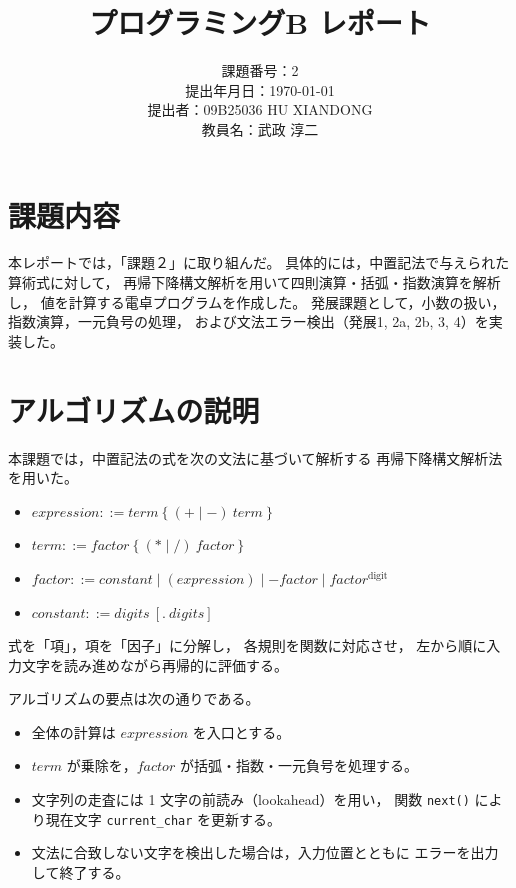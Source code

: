 \documentclass[a4paper,12pt,titlepage]{jsarticle}
\title{プログラミングB レポート}
\author{課題番号：2\\提出年月日：\today\\提出者：09B25036 HU XIANDONG\\教員名：武政 淳二}
\date{}
\begin{document}
\maketitle

\section{課題内容}

本レポートでは，「課題２」に取り組んだ。
具体的には，中置記法で与えられた算術式に対して，
再帰下降構文解析を用いて四則演算・括弧・指数演算を解析し，
値を計算する電卓プログラムを作成した。
発展課題として，小数の扱い，指数演算，一元負号の処理，
および文法エラー検出（発展1, 2a, 2b, 3, 4）を実装した。

\section{アルゴリズムの説明}

本課題では，中置記法の式を次の文法に基づいて解析する
再帰下降構文解析法を用いた。

\begin{itemize}
    \item $expression ::= term\ \lbrace\ (+ \mid -)\ term\ \rbrace$
    \item $term ::= factor\ \lbrace\ (* \mid /)\ factor\ \rbrace$
    \item $factor ::= constant \mid (expression) \mid -factor \mid factor^{\text{digit}}$
    \item $constant ::= digits\ [.\ digits]$
\end{itemize}

式を「項」，項を「因子」に分解し，
各規則を関数に対応させ，
左から順に入力文字を読み進めながら再帰的に評価する。

アルゴリズムの要点は次の通りである。

\begin{itemize}
    \item 全体の計算は $expression$ を入口とする。
    \item $term$ が乗除を，$factor$ が括弧・指数・一元負号を処理する。
    \item 文字列の走査には 1 文字の前読み（lookahead）を用い，
    関数 \verb|next()| により現在文字 \verb|current_char| を更新する。
    \item 文法に合致しない文字を検出した場合は，入力位置とともに
    エラーを出力して終了する。
\end{itemize}
\end{document}
